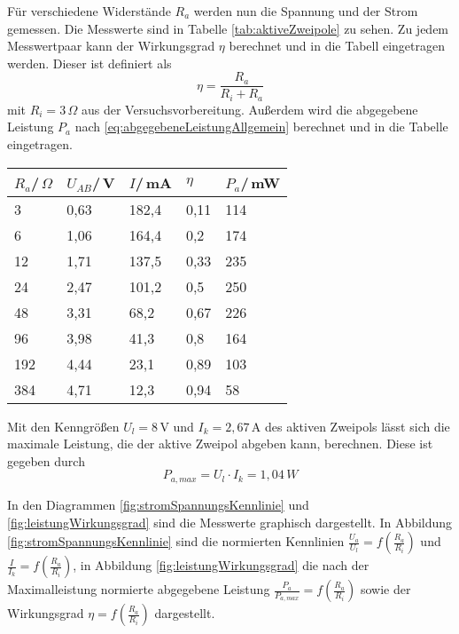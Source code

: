 Für verschiedene Widerstände $R_a$ werden nun die Spannung und der Strom gemessen. Die Messwerte sind in Tabelle \ref{tab:aktiveZweipole} zu sehen. Zu jedem Messwertpaar kann der Wirkungsgrad $\eta$ berechnet und in die Tabell eingetragen werden. Dieser ist definiert als
\begin{equation*}
    \label{eq:wirkungsgrad}
    \eta = \frac{R_a}{R_i+R_a}
\end{equation*} mit $R_i = 3\,\Omega$ aus der Versuchsvorbereitung. Außerdem wird die abgegebene Leistung $P_a$ nach \eqref{eq:abgegebeneLeistungAllgemein} berechnet und in die Tabelle eingetragen.
\begin{center}
    \begin{table}[ht]
        \begin{tabularx}{\linewidth}{|*{5}{X|}}
            \hline
            $R_a$/\,$\Omega$ & $U_{AB}$/\,V & $I$/\,mA & ${\eta}$ & $P_a$/\,mW \\
            \hline
            3                & 0,63         & 182,4    & 0,11     & 114        \\
            6                & 1,06         & 164,4    & 0,2      & 174        \\
            12               & 1,71         & 137,5    & 0,33     & 235        \\
            24               & 2,47         & 101,2    & 0,5      & 250        \\
            48               & 3,31         & 68,2     & 0,67     & 226        \\
            96               & 3,98         & 41,3     & 0,8      & 164        \\
            192              & 4,44         & 23,1     & 0,89     & 103        \\
            384              & 4,71         & 12,3     & 0,94     & 58         \\
            \hline
        \end{tabularx}
    \end{table}
\end{center}

Mit den Kenngrößen $U_l=8\,$V und $I_k=2,67\,$A des aktiven Zweipols lässt sich die maximale Leistung, die der aktive Zweipol abgeben kann, berechnen. Diese ist gegeben durch
\begin{equation*}
    P_{a,max} = U_l \cdot I_k = 1,04\,W
\end{equation*}

In den Diagrammen \ref{fig:stromSpannungsKennlinie} und \ref{fig:leistungWirkungsgrad} sind die Messwerte graphisch dargestellt. In Abbildung \ref{fig:stromSpannungsKennlinie} sind die normierten Kennlinien $\frac{U_a}{U_l}=f\left(\frac{R_a}{R_i}\right)$ und $\frac{I}{I_k}=f\left(\frac{R_a}{R_i}\right)$, in Abbildung \ref{fig:leistungWirkungsgrad} die nach der Maximalleistung normierte abgegebene Leistung $\frac{P_a}{P_{a,max}}=f\left(\frac{R_a}{R_i}\right)$ sowie der Wirkungsgrad $\eta=f\left(\frac{R_a}{R_i}\right)$ dargestellt.

